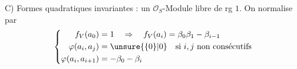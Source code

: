 C) Formes quadratiques invariantes :
un  $\mathcal O_S$-Module 
libre de rg $1$. On normalise par
\[
\left\{
\begin{aligned}
f_V(a_0)&=1\quad\Rightarrow\quad
f_V(a_i)=\beta_0\beta_1\mathbin{-}\beta_{i-1}\\
\varphi(a_i,a_j)&=\unsure{\{0\}|0}
\quad\text{si }i,j\text{ non consécutifs}\\
\varphi(a_i,a_{i+1})&=-\beta_0\mathbin{-}\beta_i
\end{aligned}\right.
\]


